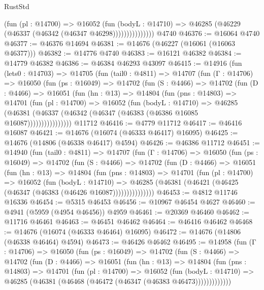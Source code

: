 \begin{lexlean}{RustStd}
\begin{coremodule}
                      (fun (pl : @14700) =>
                      @16052
                        (fun (bodyL : @14710) =>
                        @46285 (@46229 (@46337 (@46342 (@46347 @46298)))))))))))))))
    @4740
@46376 := @16064 @4740
@46377 := @46376 @14694
@46381 := @14676 (@46227 (@16061 (@16063 @46377)))
@46382 := @14776 @4740
@46383 := @16121 @46382
@46384 := @14779 @46382
@46386 := @46384 @46293 @43097
@46415 := @14916
    (fun (lets0 : @14703) =>
    @14705
      (fun (tail0 : @4811) =>
      @14707
        (fun (Γ : @14706) =>
        @16050
          (fun (ps : @16049) =>
          @14702
            (fun (S : @4466) =>
            @14702
              (fun (D : @4466) =>
              @16051
                (fun (hn : @13) =>
                @14804
                  (fun (pns : @14803) =>
                  @14701
                    (fun (pl : @14700) =>
                    @16052
                      (fun (bodyL : @14710) =>
                      @46285
                        (@46381
                          (@46337 (@46342 (@46347 (@46383 (@46386 @16085 @16087))))))))))))))))
    @11712
@46416 := @4779 @11712
@46417 := @46416 @16087
@46421 := @14676 (@16074 (@46333 @46417) @16095)
@46425 := @14676 (@14806 (@46338 @46417) @4594)
@46426 := @46386 @11712
@46451 := @14940
    (fun (tail0 : @4811) =>
    @14707
      (fun (Γ : @14706) =>
      @16050
        (fun (ps : @16049) =>
        @14702
          (fun (S : @4466) =>
          @14702
            (fun (D : @4466) =>
            @16051
              (fun (hn : @13) =>
              @14804
                (fun (pns : @14803) =>
                @14701
                  (fun (pl : @14700) =>
                  @16052
                    (fun (bodyL : @14710) =>
                    @46285 (@46381 (@46421 (@46425 (@46347 (@46383 (@46426 @16087)))))))))))))))
@46453 := @4812 @11746 @16336
@46454 := @5315 @46453
@46456 := @10967 @46454 @4627
@46460 := @4941 (@5959 (@4954 @46456)) @4959
@46461 := @20369 @46460
@46462 := @11716 @46461
@46463 := @46451 @46462
@46464 := @46416 @46462
@46468 := @14676 (@16074 (@46333 @46464) @16095)
@46472 := @14676 (@14806 (@46338 @46464) @4594)
@46473 := @46426 @46462
@46495 := @14958
    (fun (Γ : @14706) =>
    @16050
      (fun (ps : @16049) =>
      @14702
        (fun (S : @4466) =>
        @14702
          (fun (D : @4466) =>
          @16051
            (fun (hn : @13) =>
            @14804
              (fun (pns : @14803) =>
              @14701
                (fun (pl : @14700) =>
                @16052
                  (fun (bodyL : @14710) =>
                  @46285 (@46381 (@46468 (@46472 (@46347 (@46383 @46473)))))))))))))

\end{coremodule}
\end{lexlean}
